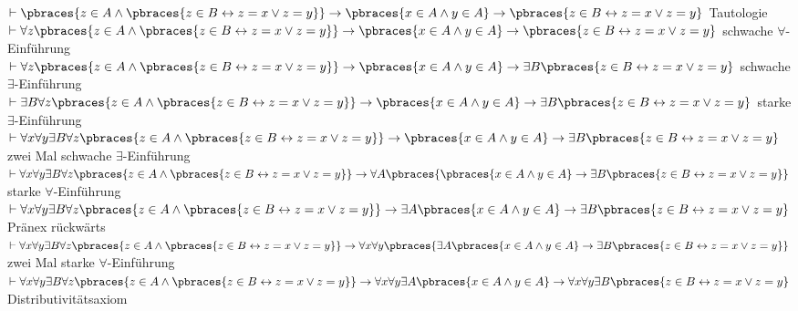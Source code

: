 
\begin{exercise}[259]

\phantom{}

\end{exercise}


\begin{solution}

\phantom{}

\begin{algorithmic}[1]
	\State $\vdash \pbraces{z \in A \land \pbraces{z \in B \leftrightarrow z = x \lor z = y}} \rightarrow \pbraces{x \in A \land y \in A} \rightarrow \pbraces{z \in B \leftrightarrow z = x \lor z=y}$ \Comment Tautologie
	\State $\vdash \forall z \pbraces{z \in A \land \pbraces{z \in B \leftrightarrow z = x \lor z = y}} \rightarrow \pbraces{x \in A \land y \in A} \rightarrow \pbraces{z \in B \leftrightarrow z = x \lor z=y}$ \Comment schwache $\forall$-Einführung
	\State $\vdash \forall z \pbraces{z \in A \land \pbraces{z \in B \leftrightarrow z = x \lor z = y}} \rightarrow \pbraces{x \in A \land y \in A} \rightarrow \exists B \pbraces{z \in B \leftrightarrow z = x \lor z=y}$ \Comment schwache $\exists$-Einführung
	\State $\vdash \exists B \forall z \pbraces{z \in A \land \pbraces{z \in B \leftrightarrow z = x \lor z = y}} \rightarrow \pbraces{x \in A \land y \in A} \rightarrow \exists B \pbraces{z \in B \leftrightarrow z = x \lor z=y}$ \Comment starke $\exists$-Einführung
	\State $\vdash \forall x \forall y \exists B \forall z \pbraces{z \in A \land \pbraces{z \in B \leftrightarrow z = x \lor z = y}} \rightarrow \pbraces{x \in A \land y \in A} \rightarrow \exists B \pbraces{z \in B \leftrightarrow z = x \lor z=y}$ \Comment zwei Mal schwache $\exists$-Einführung
	\State $\vdash \forall x \forall y \exists B \forall z \pbraces{z \in A \land \pbraces{z \in B \leftrightarrow z = x \lor z = y}} \rightarrow \forall A\pbraces{\pbraces{x \in A \land y \in A} \rightarrow \exists B \pbraces{z \in B \leftrightarrow z = x \lor z=y}}$ \Comment starke $\forall$-Einführung
	\State $\vdash \forall x \forall y \exists B \forall z \pbraces{z \in A \land \pbraces{z \in B \leftrightarrow z = x \lor z = y}} \rightarrow \exists A \pbraces{x \in A \land y \in A} \rightarrow \exists B \pbraces{z \in B \leftrightarrow z = x \lor z=y}$ \Comment Pränex rückwärts
	\State $\vdash \forall x \forall y \exists B \forall z \pbraces{z \in A \land \pbraces{z \in B \leftrightarrow z = x \lor z = y}} \rightarrow \forall x \forall y\pbraces{\exists A \pbraces{x \in A \land y \in A} \rightarrow \exists B \pbraces{z \in B \leftrightarrow z = x \lor z=y}}$ \Comment zwei Mal starke $\forall$-Einführung
	\State $\vdash \forall x \forall y \exists B \forall z \pbraces{z \in A \land \pbraces{z \in B \leftrightarrow z = x \lor z = y}} \rightarrow \forall x \forall y \exists A \pbraces{x \in A \land y \in A} \rightarrow \forall x \forall y \exists B \pbraces{z \in B \leftrightarrow z = x \lor z=y}$ \Comment Distributivitätsaxiom
\end{algorithmic}

\end{solution}
